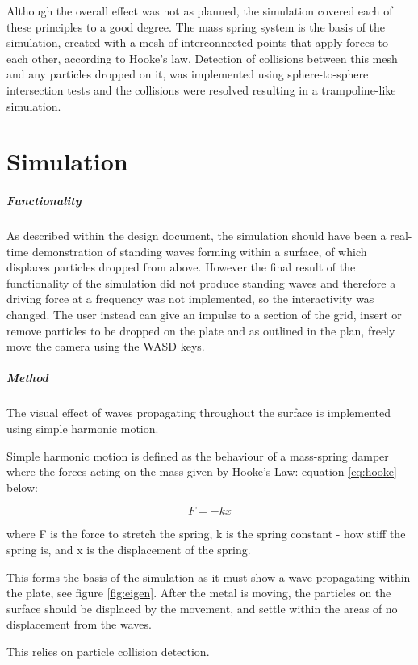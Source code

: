 \documentclass[conference,backref=page]{acmsiggraph}
\begin{document}
Although the overall effect was not as planned, the simulation covered each of these principles to a good degree. The mass spring system is the basis of the simulation, created with a mesh of interconnected points that apply forces to each other, according to Hooke's law. Detection of collisions between this mesh and any particles dropped on it, was implemented using sphere-to-sphere intersection tests and the collisions were resolved resulting in a trampoline-like simulation. 

\section{Simulation}


\subparagraph{Functionality}

As described within the design document, the simulation should have been a real-time demonstration of standing waves forming within a surface, of which displaces particles dropped from above. However the final result of the functionality of the simulation did not produce standing waves and therefore a driving force at a frequency was not implemented, so the interactivity was changed. The user instead can give an impulse to a section of the grid, insert or remove particles to be dropped on the plate and as outlined in the plan, freely move the camera using the WASD keys.

\subparagraph{Method}
 The visual effect of waves propagating throughout the surface is implemented using simple harmonic motion.

Simple harmonic motion is defined as the behaviour of a mass-spring damper where the forces acting on the mass given by Hooke's Law: equation \ref{eq:hooke} below:

 \begin{equation} \label{eq:hooke}
 F = -kx
 \end{equation}

 where F is the force to stretch the spring, k is the spring constant - how stiff the spring is, and x is the displacement of the spring.
 
 This forms the basis of the simulation as it must show a wave propagating within the plate, see figure \ref{fig:eigen}. After the metal is moving, the particles on the surface should be displaced by the movement, and settle within the areas of no displacement from the waves.
 
 This relies on particle collision detection.
 
\end{document}
